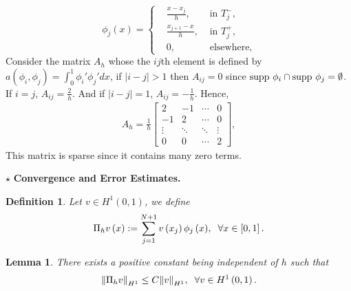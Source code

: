 \documentclass[11pt,a4paper,center,notitlepage]{article}
\numberwithin{equation}{section}
\newtheorem{lemma}{Lemma}[section]
\newtheorem{definition}{Definition}[section]
\begin{document}
\begin{equation}
{\phi _j}\left( x \right) = \left\{ \begin{split}
& \frac{{x - {x_j}}}{h}, &\mbox{ in } T_j^ - ,\\
& \frac{{{x_{j + 1}} - x}}{h}, &\mbox{ in } T_j^ + ,\\
& 0, &\mbox{ elsewhere},
\end{split} \right.
\end{equation}
Consider the matrix $A_h$ whose the $ij$th element is defined by $a\left( {{\phi _i},{\phi _j}} \right) = \int_0^1 {{\phi _i}'{\phi _j}'dx}$, if $\left| {i - j} \right| > 1$ then $A_{ij} =0$ since  ${\rm supp}\ \phi _i \cap {\rm supp}\ \phi _j =\emptyset$. If $i=j$, $A_{ij}=\frac{2}{h}$. And if $\left| {i - j} \right| = 1$, $A_{ij}=-\frac{1}{h}$. Hence, 
\begin{align}
{A_h} = \frac{1}{h}\left[ {\begin{array}{*{20}{c}}
2&{ - 1}& \cdots &0\\
{ - 1}&2& \cdots &0\\
 \vdots & \ddots & \ddots & \vdots \\
0&0& \cdots &2
\end{array}} \right],
\end{align}
This matrix is sparse since it contains many zero terms.

\noindent
$\star$ \textbf{Convergence and Error Estimates.} 
\begin{definition}
Let $v\in H^1\left(0,1\right)$, we define 
\begin{align}
{\Pi _h}v\left( x \right): = \sum\limits_{j = 1}^{N + 1} {v\left( {{x_j}} \right){\phi _j}\left( x \right)}, \hspace{2mm} \forall x\in \left[0,1\right].
\end{align}
\end{definition}

\begin{lemma}
There exists a positive constant being independent of $h$ such that 
\begin{align}
{\left\| {{\Pi _h} v } \right\|_{{H^1}}} \le C{\left\| v \right\|_{{H^1}}},\hspace{2mm} \forall v \in {H^1}\left( {0,1} \right).
\end{align}
\end{lemma}
\end{document}
